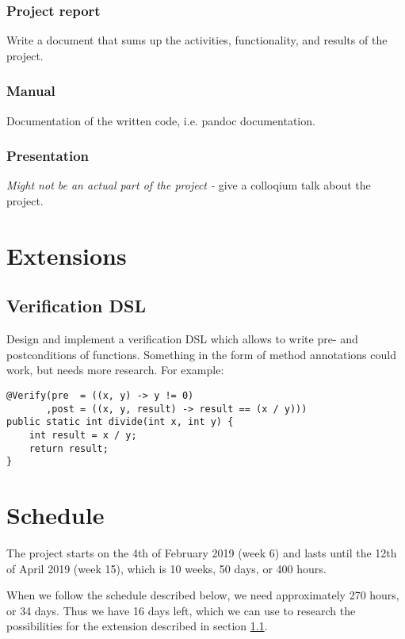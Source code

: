 \documentclass[a4paper]{article}
\begin{document}
\subsubsection{Project report}
Write a document that sums up the activities, functionality, and results of the 
project.

\subsubsection{Manual}
Documentation of the written code, i.e. pandoc documentation.

\subsubsection{Presentation}
\textit{Might not be an actual part of the project - } give a colloqium talk
about the project.

\section{Extensions} \label{sec:extensions}
\subsection{Verification DSL} \label{sec:extensions_verdsl}
Design and implement a verification DSL which allows to write pre- and postconditions
of functions. Something in the form of method annotations could work, but needs 
more research. For example:

\begin{verbatim}
@Verify(pre  = ((x, y) -> y != 0)
       ,post = ((x, y, result) -> result == (x / y)))
public static int divide(int x, int y) {
    int result = x / y;
    return result;
}
\end{verbatim}

\section{Schedule}
The project starts on the 4th of February 2019 (week 6) and  lasts until the 12th 
of April 2019 (week 15), which is 10 weeks, 50 days, or 400 hours. 

When we follow the schedule described below, we need approximately 270 hours, or
34 days. Thus we have 16 days left, which we can use to research the possibilities 
for the extension described in section \ref{sec:extensions_verdsl}.
\end{document}
